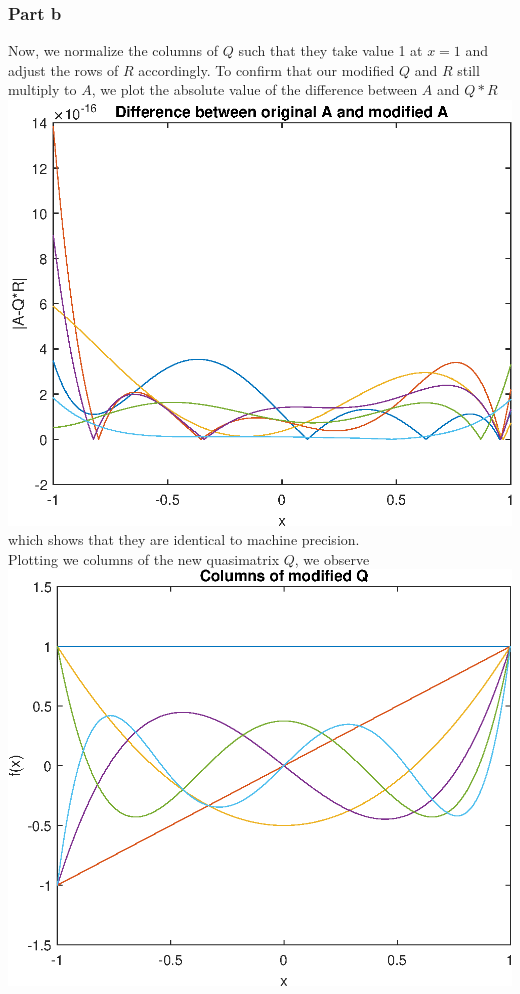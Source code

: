 \documentclass{article}
\begin{document}
\subsubsection{Part b}
Now, we normalize the columns of $Q$ such that they take value 1 at $x=1$ and adjust the rows of $R$ accordingly. To confirm that our modified $Q$ and $R$ still multiply to $A$, we plot the absolute value of the difference between $A$ and $Q*R$\\
\includegraphics[scale=0.6]{17_4.eps}\\
which shows that they are identical to machine precision. \\
Plotting we columns of the new quasimatrix $Q$, we observe\\
\includegraphics[scale=0.6]{17_5.eps}\\
\end{document}
